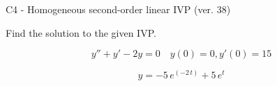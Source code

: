 \begin{exercise}
  \begin{exerciseTitle}C4 - Homogeneous second-order linear IVP (ver. 38)\end{exerciseTitle}
  \begin{exerciseStatement}
    
Find the solution to the given IVP.

    
\[y''+y'-2y = 0 \hspace{1em} y(0) = 0 , y'(0) = 15\]

  \end{exerciseStatement}
  \begin{exerciseAnswer}
    
\[y= -5 \, e^{\left(-2 \, t\right)} + 5 \, e^{t}\]

  \end{exerciseAnswer}
\end{exercise}